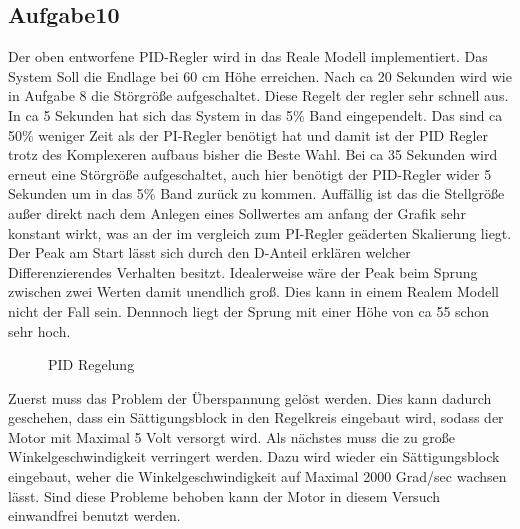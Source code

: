 \documentclass[10pt]{scrartcl}
\begin{document}
\subsection{Aufgabe10}	
Der oben entworfene PID-Regler wird in das Reale Modell implementiert.
Das System Soll die Endlage bei 60 cm Höhe erreichen. Nach ca 20 Sekunden wird wie in Aufgabe 8 die Störgröße aufgeschaltet. Diese Regelt der regler sehr schnell aus. In ca 5 Sekunden hat sich das System in das 5\% Band eingependelt. Das sind ca 50\% weniger Zeit als der PI-Regler benötigt hat und damit ist der PID Regler trotz des Komplexeren aufbaus bisher die Beste Wahl.
Bei ca 35 Sekunden wird erneut eine Störgröße aufgeschaltet, auch hier benötigt der PID-Regler wider 5 Sekunden um in das 5\% Band zurück zu kommen.
Auffällig ist das die Stellgröße außer direkt nach dem Anlegen eines Sollwertes am anfang der Grafik sehr konstant wirkt, was an der im vergleich zum PI-Regler geäderten Skalierung liegt.
Der Peak am Start lässt sich durch den D-Anteil erklären welcher Differenzierendes Verhalten besitzt. Idealerweise wäre der Peak beim Sprung zwischen zwei Werten damit unendlich groß. Dies kann in einem Realem Modell nicht der Fall sein. Dennnoch liegt der Sprung mit einer Höhe von ca 55 schon sehr hoch.
\begin{figure} [H]
\caption{PID Regelung} 
\end{figure}
Zuerst muss das Problem der Überspannung gelöst werden. Dies kann dadurch geschehen, dass ein Sättigungsblock in den Regelkreis eingebaut wird, sodass der Motor mit Maximal 5 Volt versorgt wird. Als nächstes muss die zu große Winkelgeschwindigkeit verringert werden. Dazu wird wieder ein Sättigungsblock eingebaut, weher die Winkelgeschwindigkeit auf Maximal 2000 Grad/sec wachsen lässt. Sind diese Probleme behoben kann der Motor in diesem Versuch einwandfrei benutzt werden. 
\end{document}
